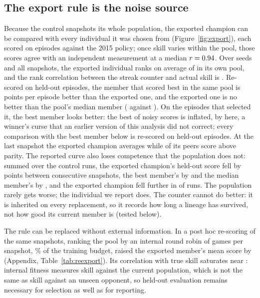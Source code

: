 \documentclass[11pt]{article}
\begin{document}
\subsection{The export rule is the noise source}
\label{sec:export}

Because the control snapshots its whole population, the exported champion can
be compared with every individual it was chosen from (Figure~\ref{fig:export}),
each scored on \nPhEpisodes{} episodes against the 2015 policy; once skill
varies within the pool, those scores agree with an independent measurement at
a median $r=0.94$. Over \nProxyRuns{}
seeds and all snapshots, the exported individual ranks on average
\nProxyRankMean{} of \nProxyPop{} in its own pool, and the rank correlation
between the streak counter and actual skill is \nProxyRho. Re-scored on
\nSelectEpisodes{} held-out episodes, the member that scored best in the same
pool is \nPhGap{} points per episode better than the exported one, and the
exported one is no better than the pool's median member (\nPhLevelExp{}
against \nPhLevelMed). On the episodes that selected it, the best member looks
\nPhGapSelecting{} better: the best of \nProxyPop{} noisy scores is inflated,
by \nPhInflation{} here, a winner's curse that an earlier version of this
analysis did not correct; every comparison with the best member below is
re-scored on held-out episodes. At the last snapshot the exported champion
averages \nProxyEndExported{} while \nProxyEndAbove{} of its peers score above
parity. The reported curve also loses competence that the population does
not: summed over the control runs, the exported champion's held-out score fell
by \nPhDeclExp{} points between consecutive snapshots, the best member's by
\nPhDeclBest{} and the median member's by \nPhDeclMed, and the exported
champion fell further in \nPhDeclRuns{} of \nPhRuns{} runs. The population
rarely gets worse; the individual we report does. The counter cannot do
better: it is inherited on every replacement, so it records how long a lineage
has survived, not how good its current member is (tested below).

The rule can be replaced without external information. In a post hoc
re-scoring of the same snapshots, ranking the pool by an internal round robin
of \nReexportGamesMax{} games per snapshot, \nReexportBudgetPct\% of the
training budget, raised the exported member's mean score by
\nReexportGainMax{} (Appendix, Table~\ref{tab:reexport}). Its correlation with
true skill saturates near \nReexportRhoMax: internal fitness measures skill
against the current population, which is not the same as skill against an
unseen opponent, so held-out evaluation remains necessary for selection as
well as for reporting.
\end{document}
